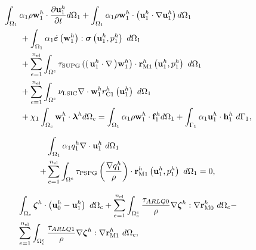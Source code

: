 \documentclass[tese_patricia]{subfiles}
\begin{document}
\begin{align}
	\begin{split}
		&\int_{\domain_1} \arlequinWFLocal \density \wlocalh \cdot \frac{\partial\ulocalh}{\partial t} d\domain_{1} +
		\int_{\domain_1} \arlequinWFLocal \density \wlocalh \cdot  \left(\ulocalh \cdot \nabla\ulocalh\right) d\domain_{1}  \\ 
		&\qquad+	
		\int_{\domain_{1}} \arlequinWFLocal \strainratetensor \left(\wlocalh\right) : \stresstensor \left(\ulocalh,\plocalh\right)\ d\domain_{1} 
		\\ 
		&\qquad+ \sum_{e=1}^{\nel} \int_{\domainE} \SUPG  \left( \right(\ulocalh \cdot \nabla \left) \wlocalh\right) \cdot \resMomLocal\left(\ulocalh,\plocalh \right)\  d\domain_{1} \\ 
		&\qquad+\sum_{e=1}^{\nel} \int_{\domainE} \LSIC \nabla \cdot \wlocalh \resPreLocal
		\left(\ulocalh\right)\  d\domain_{1} \\
		&\qquad+ \chi_{1} \int_{\domain_c} \wlocalh \cdot \lagrangeMultiplier^{h} d\domain_{c}  = \int_{\domain_1} \arlequinWFLocal \density \wlocalh \cdot  \sbodyforce_{1}^{h} d\domain_{1} + \int_{\boundary_{1}} \arlequinWFLocal \ulocalh \cdot \straction_{1}^{h}\ d\boundary_{1}, \\
		\label{eq:FinalSystem1est}
	\end{split}
\end{align}


\begin{align}
	\begin{split}
		&	\int_{\Omega_{1}} \alpha_1 q_1^h \nabla \cdot \mathbf{u}_1^h \ d\Omega_{1}\\ +
		&\sum_{e=1}^{n_{\mathrm{el}}} \int_{\Omega^e} \tau_{\mathrm{PSPG}} \left(\frac{\nabla q_1^h}{\rho}\right) \cdot \mathbf{r}_{\mathrm{M1}}^{h} \left(\mathbf{u}_1^h,p_1^h\right) \  d\Omega_{1} = 0, \\
		\label{eq:RC1est}
	\end{split}
\end{align}

\begin{align}
	\begin{split}
	&\int_{\Omega_{c}}  \boldsymbol{\zeta}^h  \cdot \left(\mathbf{u}_0^h - \mathbf{u}_1^h \right) \ d\Omega_{c} + \sum_{e=1}^{n_{\mathrm{el}}} \int_{\Omega^e_{c}} \frac{\tau_{ARLQ0}}{\rho} \nabla \boldsymbol{\zeta}^h : \nabla \mathbf{r}_{\mathrm{M0}}^{h} \ d\Omega_{c} - \\
	&\sum_{e=1}^{n_{\mathrm{el}}} \int_{\Omega^e_{c}} \frac{\tau_{ARLQ1}}{\rho} \nabla \boldsymbol{\zeta}^h : \nabla \mathbf{r}_{\mathrm{M1}}^{h} \ d\Omega_{c},
	\label{eq:EqAcoplaest}
\end{split}
\end{align}
\end{document}
